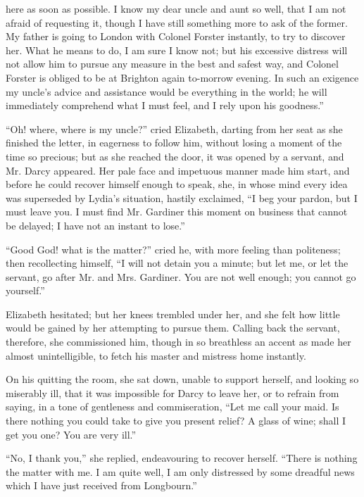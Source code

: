 \documentclass[12pt]{book}
\begin{document}
here as soon as possible. I know my dear uncle and aunt so well, that I am not afraid of requesting it, though I have still something more to ask of the former. My father is going to London with Colonel Forster instantly, to try to discover her. What he means to do, I am sure I know not; but his excessive distress will not allow him to pursue any measure in the best and safest way, and Colonel Forster is obliged to be at Brighton again to-morrow evening. In such an exigence my uncle's advice and assistance would be everything in the world; he will immediately comprehend what I must feel, and I rely upon his goodness.''

``Oh! where, where is my uncle?'' cried Elizabeth, darting from her seat as she finished the letter, in eagerness to follow him, without losing a moment of the time so precious; but as she reached the door, it was opened by a servant, and Mr. Darcy appeared. Her pale face and impetuous manner made him start, and before he could recover himself enough to speak, she, in whose mind every idea was superseded by Lydia's situation, hastily exclaimed, ``I beg your pardon, but I must leave you. I must find Mr. Gardiner this moment on business that cannot be delayed; I have not an instant to lose.''

``Good God! what is the matter?'' cried he, with more feeling than politeness; then recollecting himself, ``I will not detain you a minute; but let me, or let the servant, go after Mr. and Mrs. Gardiner. You are not well enough; you cannot go yourself.''

Elizabeth hesitated; but her knees trembled under her, and she felt how little would be gained by her attempting to pursue them. Calling back the servant, therefore, she commissioned him, though in so breathless an accent as made her almost unintelligible, to fetch his master and mistress home instantly.

On his quitting the room, she sat down, unable to support herself, and looking so miserably ill, that it was impossible for Darcy to leave her, or to refrain from saying, in a tone of gentleness and commiseration, ``Let me call your maid. Is there nothing you could take to give you present relief? A glass of wine; shall I get you one? You are very ill.''

``No, I thank you,'' she replied, endeavouring to recover herself. ``There is nothing the matter with me. I am quite well, I am only distressed by some dreadful news which I have just received from Longbourn.''
\end{document}
